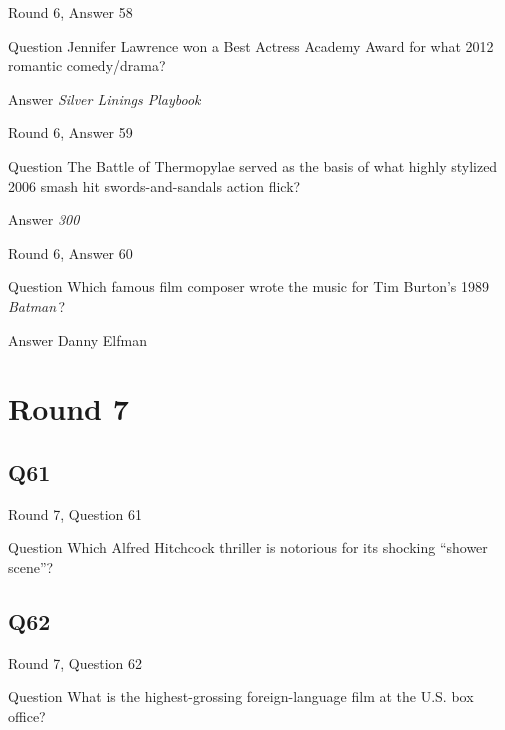 \documentclass[11pt]{beamer}
\begin{document}
\begin{frame}[t]{Round 6, Answer 58}
\vspace{2em}
\begin{block}{Question}
Jennifer Lawrence won a Best Actress Academy Award for what 2012 romantic comedy/drama?
\end{block}
\pause{}
\begin{block}{Answer}
\emph{Silver Linings Playbook}
\end{block}
\end{frame}
    

\begin{frame}[t]{Round 6, Answer 59}
\vspace{2em}
\begin{block}{Question}
The Battle of Thermopylae served as the basis of what highly stylized 2006 smash hit swords-and-sandals action flick?
\end{block}
\pause{}
\begin{block}{Answer}
\emph{300}
\end{block}
\end{frame}
    

\begin{frame}[t]{Round 6, Answer 60}
\vspace{2em}
\begin{block}{Question}
Which famous film composer wrote the music for Tim Burton's 1989 \emph{Batman}\,?
\end{block}
\pause{}
\begin{block}{Answer}
Danny Elfman
\end{block}
\end{frame}
    

\section{Round 7}
    

\subsection*{Q61}
\begin{frame}[t]{Round 7, Question 61}
\vspace{2em}
\begin{block}{Question}
Which Alfred Hitchcock thriller is notorious for its shocking ``shower scene''?
\end{block}
\end{frame}
    

\subsection*{Q62}
\begin{frame}[t]{Round 7, Question 62}
\vspace{2em}
\begin{block}{Question}
What is the highest-grossing foreign-language film at the U.S. box office?
\end{block}
\end{frame}
    
\end{document}
